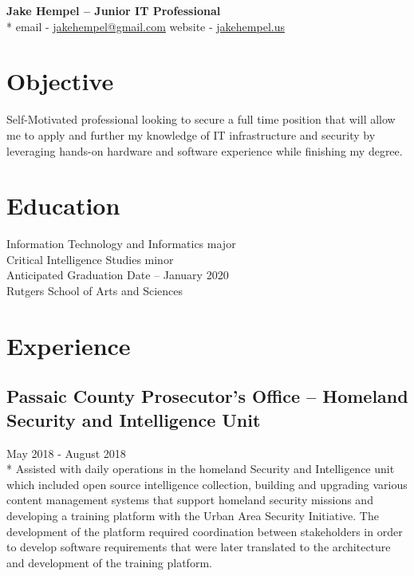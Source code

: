 \documentclass{article}
\begin{document}
\begin{samepage}

\begin{center}
\huge{\textbf{Jake Hempel -- Junior IT Professional}} \\*
\large{email - \href{mailto:jakehempel@gmail.com}{jakehempel@gmail.com}
website - \href{jakehempel.us}{jakehempel.us}}
\end{center}

\section{Objective}
Self-Motivated professional looking to secure a full time position that will allow me to apply and further my knowledge of IT infrastructure and security by leveraging hands-on hardware and software experience while finishing my degree.


\section{Education}
Information Technology and Informatics major\\
Critical Intelligence Studies minor\\
Anticipated Graduation Date -- January 2020\\
Rutgers School of Arts and Sciences


\section{Experience}

\subsection{Passaic County Prosecutor's Office -- Homeland Security and Intelligence Unit}
May 2018 - August 2018\\*
Assisted with daily operations in the homeland Security and Intelligence unit which included open source intelligence collection, building and upgrading various content management systems that support homeland security missions and developing a training platform with the Urban Area Security Initiative.  The development of the platform required coordination between stakeholders in order to develop software requirements that were later translated to the architecture and development of the training platform.


\end{samepage}
\end{document}
